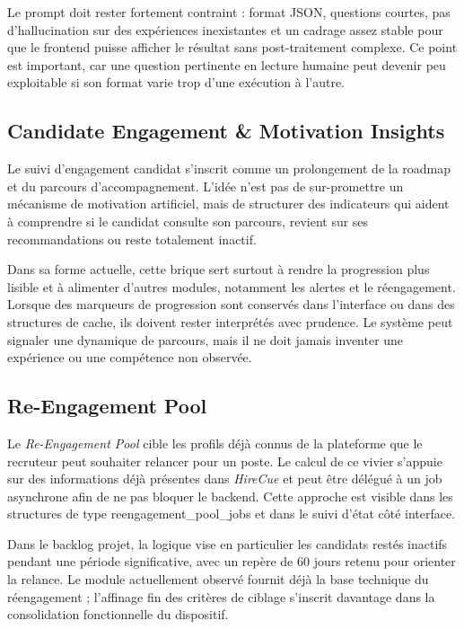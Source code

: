 Le prompt doit rester fortement contraint : format JSON, questions courtes, pas d'hallucination sur des expériences inexistantes et un cadrage assez stable pour que le frontend puisse afficher le résultat sans post-traitement complexe. Ce point est important, car une question pertinente en lecture humaine peut devenir peu exploitable si son format varie trop d'une exécution à l'autre.

\subsection{Candidate Engagement \& Motivation Insights}

Le suivi d'engagement candidat s'inscrit comme un prolongement de la roadmap et du parcours d'accompagnement. L'idée n'est pas de sur-promettre un mécanisme de motivation artificiel, mais de structurer des indicateurs qui aident à comprendre si le candidat consulte son parcours, revient sur ses recommandations ou reste totalement inactif.

Dans sa forme actuelle, cette brique sert surtout à rendre la progression plus lisible et à alimenter d'autres modules, notamment les alertes et le réengagement. Lorsque des marqueurs de progression sont conservés dans l'interface ou dans des structures de cache, ils doivent rester interprétés avec prudence. Le système peut signaler une dynamique de parcours, mais il ne doit jamais inventer une expérience ou une compétence non observée.

\subsection{Re-Engagement Pool}

Le \textit{Re-Engagement Pool} cible les profils déjà connus de la plateforme que le recruteur peut souhaiter relancer pour un poste. Le calcul de ce vivier s'appuie sur des informations déjà présentes dans \textit{HireCue} et peut être délégué à un job asynchrone afin de ne pas bloquer le backend. Cette approche est visible dans les structures de type reengagement\_pool\_jobs et dans le suivi d'état côté interface.

Dans le backlog projet, la logique vise en particulier les candidats restés inactifs pendant une période significative, avec un repère de 60 jours retenu pour orienter la relance. Le module actuellement observé fournit déjà la base technique du réengagement ; l'affinage fin des critères de ciblage s'inscrit davantage dans la consolidation fonctionnelle du dispositif.

